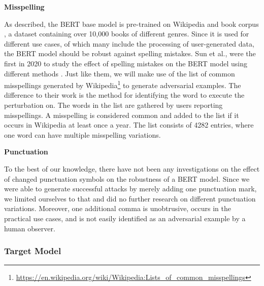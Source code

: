 \textbf{Misspelling}

As described, the BERT base model is pre-trained on Wikipedia and book corpus \cite{zhu2015aligning}, a dataset containing over 10,000 books of different genres. Since it is used for different use cases, of which many include the processing of user-generated data, the BERT model should be robust against spelling mistakes. Sun et al., were the first in 2020 to study the effect of spelling mistakes on the BERT model using different methods \cite{sun2020adv}. Just like them, we will make use of the list of common misspellings generated by Wikipedia\footnote{\url{https://en.wikipedia.org/wiki/Wikipedia:Lists_of_common_misspellings}} to generate adversarial examples. The difference to their work is the method for identifying the word to execute the perturbation on. 
The words in the list are gathered by users reporting misspellings. A misspelling is considered common and added to the list if it occurs in Wikipedia at least once a year.
The list consists of 4282 entries, where one word can have multiple misspelling variations. 


\textbf{Punctuation}

To the best of our knowledge, there have not been any investigations on the effect of changed punctuation symbols on the robustness of a BERT model. Since we were able to generate successful attacks by merely adding one punctuation mark, we limited ourselves to that and did no further research on different punctuation variations. Moreover, one additional comma is unobtrusive, occurs in the practical use cases, and is not easily identified as an adversarial example by a human observer.


\subsubsection{Target Model} 
\label{sec:target_model_method}

